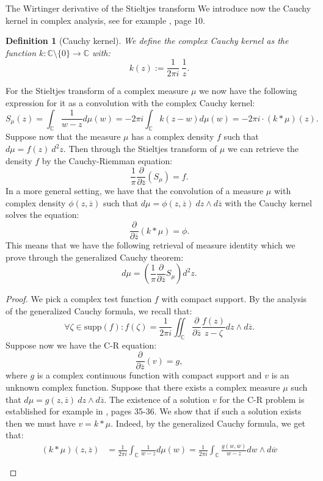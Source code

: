 \documentclass[11pt, a4paper, oneside]{book}
\numberwithin{equation}{chapter}
\newtheorem{definition}{Definition}[section]
\begin{document}
\begin{section}{The Wirtinger derivative of the Stieltjes transform}
We introduce now the Cauchy kernel in complex analysis, see for example \cite{lebl2019tasty}, page 10.
%
\begin{definition}[Cauchy kernel] We define the complex Cauchy kernel as the function $k: \mathbb{C} \setminus \{0\} \to \mathbb{C}$ with:
\[
k(z) := \frac{1}{2\pi i} \ \frac{1}{z}.
\]
\end{definition}
%
For the Stieltjes transform of a complex measure $\mu$ we now have the following expression for it as a convolution with the complex Cauchy kernel:
\[
S_\mu (z) = \int_{\mathbb{C}} \frac{1}{w-z} d\mu(w) = - 2\pi i \int_{\mathbb{C}} k(z-w) d\mu(w) = - 2\pi i \cdot (k \ast \mu)(z).
\]
%
Suppose now that the measure $\mu$ has a complex density $f$ such that $d\mu = f(z) \ d^2 z .$ Then through the Stieltjes transform of $\mu$ we can retrieve the density $f$ by the Cauchy-Riemman equation:
\[
\frac{1}{\pi} \frac{\partial}{\partial \overline{z}} ( S_\mu) = f .
\]
%
In a more general setting, we have that the convolution of a measure $\mu$ with complex density $\phi (z, \overline{z})$ such that $d\mu = \phi(z,\overline{z}) \ dz \wedge d \overline{z}$ with the Cauchy kernel solves the equation:
\[
\frac{\partial}{\partial \overline{z}} ( k \ast \mu) = \phi .
\]
This means that we have the following retrieval of measure identity which we prove through the generalized Cauchy theorem:
\[
d\mu = \left ( \frac{1}{\pi} \frac{\partial}{\partial \overline{z}} S_\mu \right ) d^2 z .
\]
%
\begin{proof}
We pick a complex test function $f$ with compact support. By the analysis of the generalized Cauchy formula, we recall that:
\[
\forall \zeta \in \mathrm{supp}(f): f(\zeta) = \frac{1}{2\pi i} \iint_{\mathbb{C}} \frac{\partial }{\partial \overline{z}} \frac{f(z)}{z - \zeta} dz \wedge d\overline{z} .
\]
%
Suppose now we have the C-R equation:
\[
 \frac{\partial}{\partial \overline{z}} ( v ) = g ,
\]
where $g$ is a complex continuous function with compact support and $v$ is an unknown complex function. Suppose that there exists a complex measure $\mu$ such that $d\mu = g(z,\overline{z}) \ dz \wedge d \overline{z}.$ The existence of a solution $v$ for the C-R problem is established for example in \cite{voisin_2002}, pages 35-36. We show that if such a solution exists then we must have $v = k \ast \mu$. Indeed, by the generalized Cauchy formula, we get that:
\begin{align*}
(k \ast \mu ) (z, \overline{z}) &= \frac{1}{2\pi i}\int_{\mathbb{C}} \frac{1}{w-z}d\mu(w) =  \frac{1}{2\pi i }\int_{\mathbb{C}} \frac{g (w,\overline{w})}{w-z}dw \wedge d \overline{w} \\ \\

\end{align*}
\end{proof}
\end{section}
\end{document}
